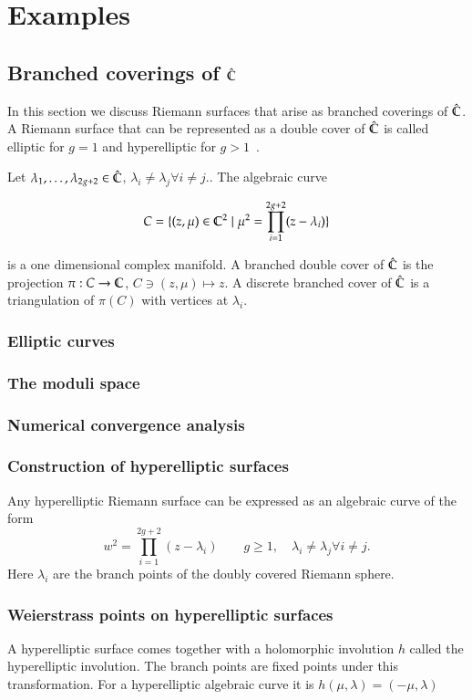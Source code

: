 \chapter{Examples}

\section{Branched coverings of $\hat{\mathbb C}$}
In this section we discuss Riemann surfaces that arise as branched coverings of $\hat{\mathbb C}$. A Riemann surface that can be represented as a double cover of $\hat{\mathbb C}$ is called elliptic for $g=1$ and hyperelliptic for $g>1$~\cite[p.~235]{Jost2007}. 

Let $\lambda_1,\ldots,\lambda_{2g+2}\in \hat{\mathbb C}$, $\lambda_i\neq \lambda_j \forall i\neq j.$. The algebraic curve

\begin{equation}
\label{eq:branched_cover}
C=\{(z, \mu)\in\mathbb C^2 \mid \mu^2 = \prod_{i=1}^{2g+2}(z-\lambda_i)\}
\end{equation}

is a one dimensional complex manifold. A branched double cover of $\hat{\mathbb C}$ is the projection $\pi:C\to\mathbb C$, $C\ni(z,\mu)\mapsto z$. A discrete branched cover of $\hat{\mathbb C}$ is a triangulation of $\pi(C)$ with vertices at $\lambda_i$.

\subsection{Elliptic curves}
\subsection{The moduli space}
\subsection{Numerical convergence analysis}

\subsection{Construction of hyperelliptic surfaces}
Any hyperelliptic Riemann surface can be expressed as an algebraic curve of the form
\[ w^2 = \prod_{i=1}^{2g+2}(z-\lambda_i) \quad\quad g\geq1,\quad \lambda_i\neq \lambda_j \forall i\neq j.\]
Here $\lambda_i$ are the branch points of the doubly covered Riemann sphere.

\subsection{Weierstrass points on hyperelliptic surfaces}
A hyperelliptic surface comes together with a holomorphic involution $h$ called the hyperelliptic involution. The branch points are fixed points under this transformation. For a hyperelliptic algebraic curve it is $h(\mu, \lambda)=(-\mu, \lambda)$

